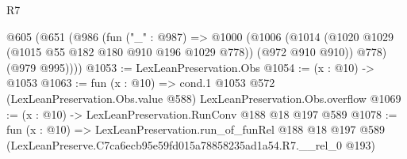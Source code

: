 \begin{lexlean}{R7}
\begin{coremodule}
  @605
    (@651
      (@986
        (fun ("_" : @987) =>
        @1000
          (@1006
            (@1014 (@1020 @1029 (@1015 @55 @182 @180 @910 @196 @1029 @778)) (@972 @910 @910))
            @778)
          (@979 @995))))
@1053 := LexLeanPreservation.Obs
@1054 := (x : @10) -> @1053
@1063 := fun (x : @10) =>
  cond.{1} @1053 @572 (LexLeanPreservation.Obs.value @588) LexLeanPreservation.Obs.overflow
@1069 := (x : @10) -> LexLeanPreservation.RunConv @188 @18 @197 @589
@1078 := fun (x : @10) =>
  LexLeanPreservation.run_of_funRel
    @188
    @18
    @197
    @589
    (LexLeanPreserve.C7ca6ecb95e59fd015a78858235ad1a54.R7.__rel_0 @193)
\end{coremodule}
\end{lexlean}
